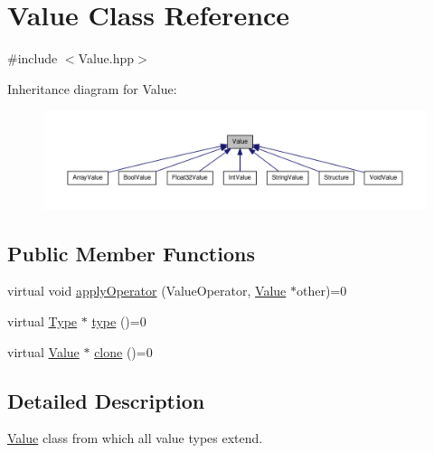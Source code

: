 \hypertarget{class_value}{\section{Value Class Reference}
\label{class_value}
}


{\ttfamily \#include $<$Value.\-hpp$>$}



Inheritance diagram for Value\-:
\nopagebreak
\begin{figure}[H]
\begin{center}
\leavevmode
\includegraphics[width=350pt]{class_value__inherit__graph}
\end{center}
\end{figure}
\subsection*{Public Member Functions}
\begin{DoxyCompactItemize}
\item 
virtual void \hyperlink{class_value_a50f4e2d2466ab9405bc13e4881ea1888}{apply\-Operator} (Value\-Operator, \hyperlink{class_value}{Value} $\ast$other)=0
\item 
virtual \hyperlink{class_type}{Type} $\ast$ \hyperlink{class_value_a46b25d5bbded88a18de463f5a90d25c7}{type} ()=0
\item 
virtual \hyperlink{class_value}{Value} $\ast$ \hyperlink{class_value_a9ae979752d769a6007656824211db2e5}{clone} ()=0
\end{DoxyCompactItemize}


\subsection{Detailed Description}
\hyperlink{class_value}{Value} class from which all value types extend. 

